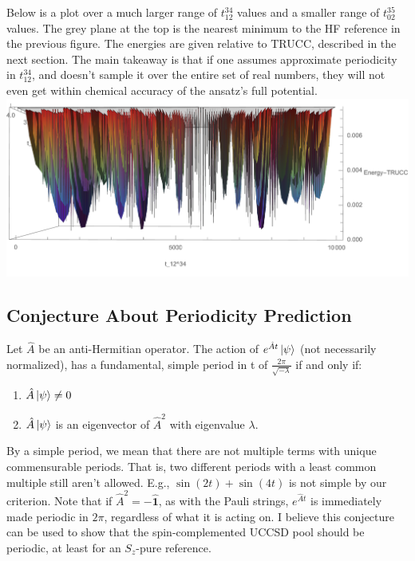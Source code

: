 \documentclass{article}
\begin{document}
Below is a plot over a much larger range of $t_{12}^{34}$ values and a smaller range of $t_{02}^{35}$ values.  The grey plane at the top is the nearest minimum to the HF reference in the previous figure.  The energies are given relative to TRUCC, described in the next section.  The main takeaway is that if one assumes approximate periodicity in $t_{12}^{34}$, and doesn't sample it over the entire set of real numbers, they will not even get within chemical accuracy of the ansatz's full potential.\\
\includegraphics[width=\textwidth]{non-periodic_2.pdf}  

\subsection*{Conjecture About Periodicity Prediction}
Let $\hat{A}$ be an anti-Hermitian operator.  The action of $e^{\hat{A}t}\ket{\psi}$ (not necessarily normalized), has a fundamental, simple period in t of $\frac{2\pi}{\sqrt{-\lambda}}$ if and only if:
\begin{enumerate}
\item $\hat{A}\ket{\psi}\neq 0$
\item $\hat{A}\ket{\psi}$ is an eigenvector of $\hat{A}^2$ with eigenvalue $\lambda$. 
\end{enumerate}
By a simple period, we mean that there are not multiple terms with unique commensurable periods.  That is, two different periods with a least common multiple still aren't allowed.  E.g., $\sin(2t)+\sin(4t)$ is not simple by our criterion.  Note that if $\hat{A}^2 = -\hat{\mathbf{1}}$, as with the Pauli strings, $e^{\hat{A}t}$ is immediately made periodic in $2\pi$, regardless of what it is acting on.  I believe this conjecture can be used to show that the spin-complemented UCCSD pool should be periodic, at least for an $S_z$-pure reference. 
 
\end{document}
